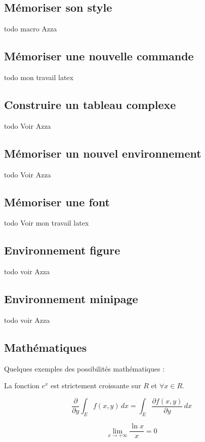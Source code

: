 \subsection{Mémoriser son style}
todo macro Azza

\subsection{Mémoriser une nouvelle commande}
todo mon travail latex

\subsection{Construire un tableau complexe}
todo  Voir Azza

\subsection{Mémoriser un nouvel environnement}
todo Voir Azza

\subsection{Mémoriser une font}
todo Voir mon travail latex

\subsection{Environnement figure}
todo voir Azza

\subsection{Environnement minipage}
todo voir Azza

\subsection{Mathématiques}

Quelques exemples des possibilités mathématiques :

La fonction $e^x$ est strictement croissante sur $R$ et $\forall x \in R$.

\begin{equation}
\frac{\partial}{\partial y}\int_E f(x,y)\,dx = \int_E \frac{\partial f(x,y)}{\partial y}\,dx
\end{equation}

$$\lim_{x \to +\infty} \frac{\ln x}{x} = 0$$

